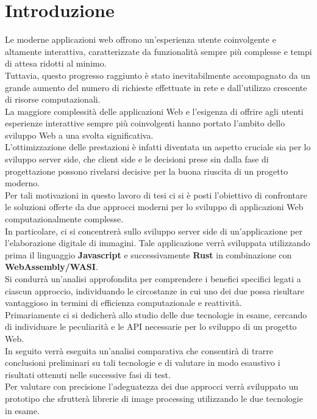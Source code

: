 \chapter*{Introduzione}
\label{Introduzione}
Le moderne applicazioni web offrono un'esperienza utente coinvolgente e altamente interattiva, caratterizzate da funzionalità sempre più complesse e tempi di attesa ridotti al minimo.
\\Tuttavia, questo progresso raggiunto è stato inevitabilmente accompagnato da un grande aumento del numero di richieste effettuate in rete e dall'utilizzo crescente di risorse computazionali.
\\La maggiore complessità delle applicazioni Web e l’esigenza di offrire agli utenti esperienze interattive sempre più coinvolgenti hanno portato l’ambito dello sviluppo Web a una svolta significativa.
\\L’ottimizzazione delle prestazioni è infatti diventata un aspetto cruciale sia per lo sviluppo server side, che client side e le decisioni prese sin dalla fase di progettazione possono rivelarsi decisive per la buona riuscita di un progetto moderno.
\\Per tali motivazioni in questo lavoro di tesi ci si è posti l'obiettivo di confrontare le soluzioni offerte da due approcci moderni per lo sviluppo di applicazioni Web computazionalmente complesse.
\\In particolare, ci si concentrerà sullo sviluppo server side di un'applicazione per l'elaborazione digitale di immagini.
Tale applicazione verrà sviluppata utilizzando prima il linguaggio \textbf{Javascript} e successivamente \textbf{Rust} in combinazione con \textbf{WebAssembly/WASI}.
\\Si condurrà un'analisi approfondita per comprendere i benefici specifici legati a ciascun approccio, individuando le circostanze in cui uno dei due possa risultare vantaggioso in termini di efficienza computazionale e reattività.
\\Primariamente ci si dedicherà allo studio delle due tecnologie in esame, cercando di individuare le peculiarità e le API necessarie per lo sviluppo di un progetto Web.
\\In seguito verrà eseguita un'analisi comparativa che consentirà di trarre conclusioni preliminari su tali tecnologie e di valutare in modo esaustivo i risultati ottenuti nelle successive fasi di test.
\\Per valutare con precisione l'adeguatezza dei due approcci verrà sviluppato un prototipo che sfrutterà librerie di image processing utilizzando le due tecnologie in esame.
